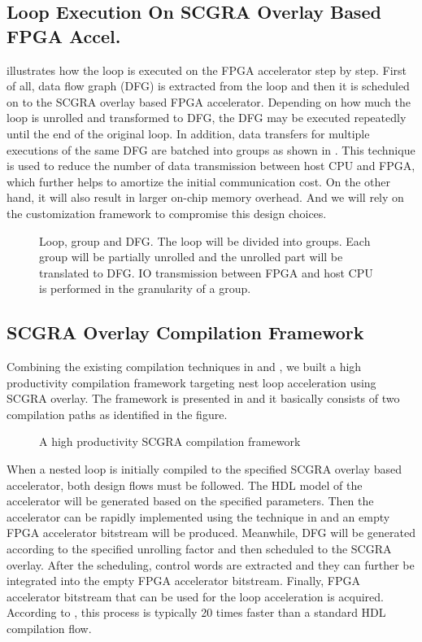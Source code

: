 \subsection{Loop Execution On SCGRA Overlay Based FPGA Accel.}
 illustrates how the loop is executed 
on the FPGA accelerator step by step. First of all, 
data flow graph (DFG) is extracted from the loop and then it 
is scheduled on to the SCGRA overlay based FPGA accelerator. 
Depending on how much the loop is unrolled and transformed 
to DFG, the DFG may be executed repeatedly until the end of 
the original loop. In addition, data transfers for 
multiple executions of the same DFG are batched into groups 
as shown in . This technique is used to 
reduce the number of data transmission between host CPU and FPGA, 
which further helps to amortize the initial communication cost. 
On the other hand, it will also result in larger on-chip memory 
overhead. And we will rely on the customization framework to 
compromise this design choices. 

\begin{figure}[tb]
\caption{Loop, group and DFG. The loop will be divided into 
groups. Each group will be partially unrolled and the unrolled part will be 
translated to DFG. IO transmission between FPGA and host CPU is performed 
in the granularity of a group.}
\label{fig:group-dfg}
\end{figure}

\subsection{SCGRA Overlay Compilation Framework}
Combining the existing compilation techniques 
in \cite{ROB2014} and \cite{scgra-orig}, we built 
a high productivity compilation framework targeting 
nest loop acceleration using SCGRA overlay. The framework 
is presented in  and it 
basically consists of two compilation paths as identified 
in the figure. 

\begin{figure}[t]
\caption{A high productivity SCGRA compilation framework}
\label{fig:detailed-compilation}
\end{figure}

When a nested loop is initially compiled to the specified SCGRA overlay based accelerator, 
both design flows must be followed. The HDL model of the accelerator 
will be generated based on the specified parameters. Then the accelerator 
can be rapidly implemented using the technique in \cite{ROB2014} and 
an empty FPGA accelerator bitstream will be produced. Meanwhile, 
DFG will be generated according to the specified unrolling factor 
and then scheduled to the SCGRA overlay. 
After the scheduling, control words are extracted and they can 
further be integrated into the empty FPGA accelerator bitstream. 
Finally, FPGA accelerator bitstream that can be used for 
the loop acceleration is acquired. According to \cite{ROB2014}, 
this process is typically 20 times faster than a standard HDL 
compilation flow. 

